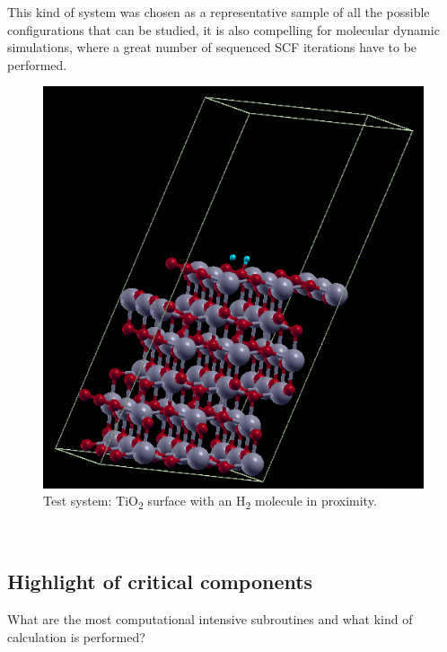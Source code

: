 \documentclass[a4paper,12pt]{article}
\begin{document}
This kind of system was chosen as a representative sample of all the possible configurations that can be studied, it is also compelling for molecular dynamic simulations, where a great number of sequenced SCF iterations have to be performed.

\begin{figure}[hhh!]

\centerline{\includegraphics[scale=0.5]{titania_crystal.png}}
	\caption{Test system: TiO\textsubscript{2} surface with an H\textsubscript{2} molecule in proximity.}
	\label{fig:titania}

\end{figure}

\newpage

~

\newpage
\subsection{Highlight of critical components}\label{sec:resCriticalComponents}

\begin{center}
\begin{framed}
What are the most computational intensive subroutines and what kind of calculation is performed?
\end{framed}
\end{center}
\end{document}
